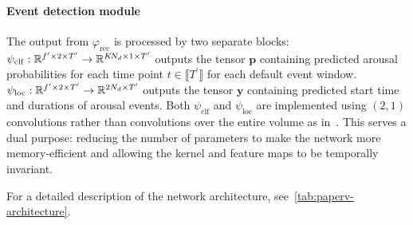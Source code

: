 \paragraph{Event detection module}
The output from $\varphi_{\mathrm{rec}}$ is processed by two separate blocks: $ \psi_{\mathrm{clf}} : \mathbb{R}^{f^{\prime} \times 2 \times T^{\prime}} \to \mathbb{R}^{K \! N_d \times 1 \times T^{\prime}} $ outputs the tensor $\mathbf{p}$ containing predicted arousal probabilities for each time point $t \in \llbracket T^{\prime} \rrbracket$ for each default event window. 
$ \psi_{\mathrm{loc}} : \mathbb{R}^{f^{\prime} \times 2 \times T^{\prime}} \to \mathbb{R}^{2N_d \times T^{\prime}} $ outputs the tensor $\mathbf{y}$ containing predicted start time and durations of arousal events. 
Both $\psi_{\mathrm{clf}}$ and $\psi_{\mathrm{loc}}$ are implemented using $\left(2, 1\right)$ convolutions rather than convolutions over the entire volume as in~\cite{Chambon2018b, Chambon2019, Olesen2019}.
This serves a dual purpose: reducing the number of parameters to make the network more memory-efficient and allowing the kernel and feature maps to be temporally invariant.

For a detailed description of the network architecture, see~\cref{tab:paperv-architecture}.

